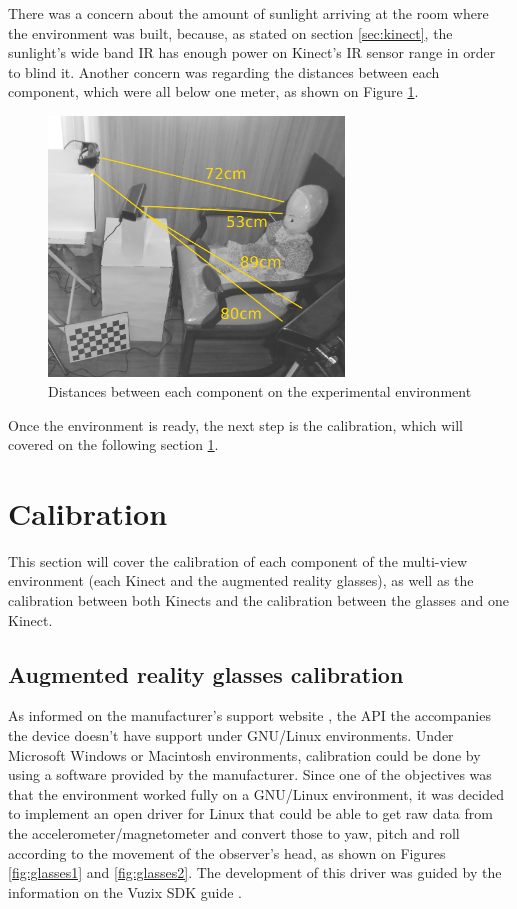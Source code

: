 \documentclass[msc, a4paper, classic, en]{ufbathesis}
\begin{document}
There was a concern about the amount of sunlight arriving at the room where the environment was built, because, as stated on section \ref{sec:kinect}, the sunlight's wide band IR has enough power on Kinect's IR sensor range in order to blind it. Another concern was regarding the distances between each component, which were all below one meter, as shown on Figure \ref{fig:expenv3}.

\begin{figure}
\centering
\includegraphics[width=0.7\textwidth]{images/expenv3.png}
\caption{Distances between each component on the experimental environment}
\label{fig:expenv3}
\end{figure}

Once the environment is ready, the next step is the calibration, which will covered on the following section \ref{sec:calibration}.

\section{Calibration}
\label{sec:calibration}

This section will cover the calibration of each component of the multi-view environment (each Kinect and the augmented reality glasses), as well as the calibration between both Kinects and the calibration between the glasses and one Kinect.

\subsection{Augmented reality glasses calibration}

As informed on the manufacturer's support website \cite{vuzixsupport}, the API the accompanies the device doesn't have support under GNU/Linux environments. Under Microsoft Windows or Macintosh environments, calibration could be done by using a software provided by the manufacturer. Since one of the objectives was that the environment worked fully on a GNU/Linux environment, it was decided to implement an open driver for Linux that could be able to get raw data from the accelerometer/magnetometer and convert those to yaw, pitch and roll according to the movement of the observer's head, as shown on Figures \ref{fig:glasses1} and \ref{fig:glasses2}. The development of this driver was guided by the information on the Vuzix SDK guide \cite{vuzixsdk}.
\end{document}
